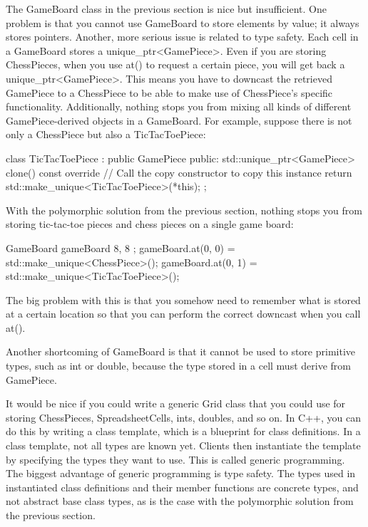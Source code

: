 The GameBoard class in the previous section is nice but insufficient. One problem is that you cannot use GameBoard to store elements by value; it always stores pointers. Another, more serious issue is related to type safety. Each cell in a GameBoard stores a unique\_ptr<GamePiece>. Even if you are storing ChessPieces, when you use at() to request a certain piece, you will get back a unique\_ptr<GamePiece>. This means you have to downcast the retrieved GamePiece to a ChessPiece to be able to make use of ChessPiece’s specific functionality. Additionally, nothing stops you from mixing all kinds of different GamePiece-derived objects in a GameBoard. For example, suppose there is not only a ChessPiece but also a TicTacToePiece:

\begin{cpp}
class TicTacToePiece : public GamePiece
{
    public:
        std::unique_ptr<GamePiece> clone() const override
        {
            // Call the copy constructor to copy this instance
            return std::make_unique<TicTacToePiece>(*this);
        }
};
\end{cpp}

With the polymorphic solution from the previous section, nothing stops you from storing tic-tac-toe pieces and chess pieces on a single game board:

\begin{cpp}
GameBoard gameBoard { 8, 8 };
gameBoard.at(0, 0) = std::make_unique<ChessPiece>();
gameBoard.at(0, 1) = std::make_unique<TicTacToePiece>();
\end{cpp}

The big problem with this is that you somehow need to remember what is stored at a certain location so that you can perform the correct downcast when you call at().

Another shortcoming of GameBoard is that it cannot be used to store primitive types, such as int or double, because the type stored in a cell must derive from GamePiece.

It would be nice if you could write a generic Grid class that you could use for storing ChessPieces, SpreadsheetCells, ints, doubles, and so on. In C++, you can do this by writing a class template, which is a blueprint for class definitions. In a class template, not all types are known yet. Clients then instantiate the template by specifying the types they want to use. This is called generic programming. The biggest advantage of generic programming is type safety. The types used in instantiated class definitions and their member functions are concrete types, and not abstract base class types, as is the case with the polymorphic solution from the previous section.

